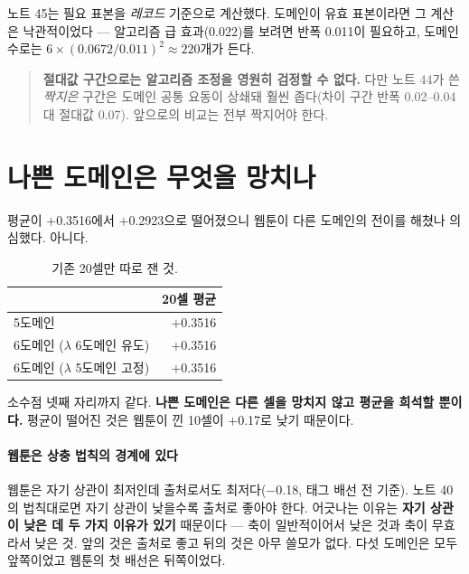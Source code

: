 \documentclass[10pt]{article}
\begin{document}

노트 45는 필요 표본을 \emph{레코드} 기준으로 계산했다. 도메인이 유효 표본이라면
그 계산은 낙관적이었다 --- 알고리즘 급 효과(0.022)를 보려면 반폭 0.011이
필요하고, 도메인 수로는 $6\times(0.0672/0.011)^2\approx220$개가 든다.

\begin{quote}\fontsize{9.5}{11.5}\selectfont
\textbf{절대값 구간으로는 알고리즘 조정을 영원히 검정할 수 없다.} 다만 노트 44가
쓴 \emph{짝지은} 구간은 도메인 공통 요동이 상쇄돼 훨씬 좁다(차이 구간 반폭
0.02--0.04 대 절대값 0.07). 앞으로의 비교는 전부 짝지어야 한다.
\end{quote}

\section{나쁜 도메인은 무엇을 망치나}

평균이 $+$0.3516에서 $+$0.2923으로 떨어졌으니 웹툰이 다른 도메인의 전이를
해쳤나 의심했다. 아니다.

\begin{table}[t]
\centering\tsize
\caption{기존 20셀만 따로 잰 것.}
\begin{tabular}{lr}
\toprule
& 20셀 평균 \\
\midrule
5도메인 & $+$0.3516 \\
6도메인 ($\lambda$ 6도메인 유도) & $+$0.3516 \\
6도메인 ($\lambda$ 5도메인 고정) & $+$0.3516 \\
\bottomrule
\end{tabular}
\end{table}

소수점 넷째 자리까지 같다. \textbf{나쁜 도메인은 다른 셀을 망치지 않고 평균을
희석할 뿐이다.} 평균이 떨어진 것은 웹툰이 낀 10셀이 $+$0.17로 낮기 때문이다.

\paragraph{웹툰은 상충 법칙의 경계에 있다}
웹툰은 자기 상관이 최저인데 출처로서도 최저다($-$0.18, 태그 배선 전 기준).
노트 40의 법칙대로면 자기 상관이 낮을수록 출처로 좋아야 한다. 어긋나는 이유는
\textbf{자기 상관이 낮은 데 두 가지 이유가 있기} 때문이다 --- 축이 일반적이어서
낮은 것과 축이 무효라서 낮은 것. 앞의 것은 출처로 좋고 뒤의 것은 아무 쓸모가
없다. 다섯 도메인은 모두 앞쪽이었고 웹툰의 첫 배선은 뒤쪽이었다.
\end{document}
